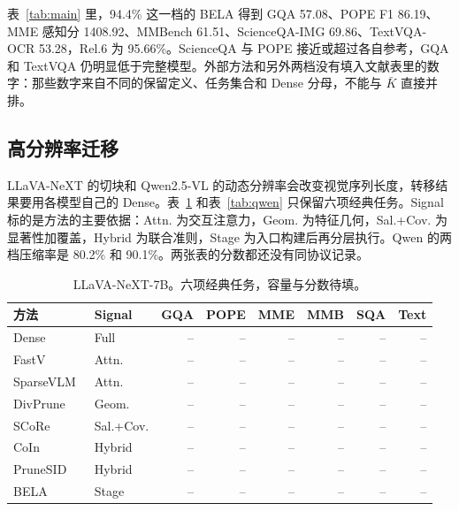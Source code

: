 表~\ref{tab:main} 里，94.4\% 这一档的 BELA 得到 GQA 57.08、POPE F1 86.19、MME 感知分 1408.92、MMBench 61.51、ScienceQA-IMG 69.86、TextVQA-OCR 53.28，Rel.6 为 95.66\%。ScienceQA 与 POPE 接近或超过各自参考，GQA 和 TextVQA 仍明显低于完整模型。外部方法和另外两档没有填入文献表里的数字：那些数字来自不同的保留定义、任务集合和 Dense 分母，不能与 $\bar K$ 直接并排。

\subsection{高分辨率迁移}
\label{sec:transfer}

LLaVA-NeXT 的切块和 Qwen2.5-VL 的动态分辨率会改变视觉序列长度，转移结果要用各模型自己的 Dense。表~\ref{tab:next} 和表~\ref{tab:qwen} 只保留六项经典任务。Signal 标的是方法的主要依据：Attn. 为交互注意力，Geom. 为特征几何，Sal.+Cov. 为显著性加覆盖，Hybrid 为联合准则，Stage 为入口构建后再分层执行。Qwen 的两档压缩率是 80.2\% 和 90.1\%。两张表的分数都还没有同协议记录。

\begin{table}[t]
\centering
\scriptsize
\setlength{\tabcolsep}{2.4pt}
\caption{LLaVA-NeXT-7B。六项经典任务，容量与分数待填。}
\label{tab:next}
\begin{tabular}{@{}llrrrrrr@{}}
\hline
方法 & Signal & GQA & POPE & MME & MMB & SQA & Text \\
\hline
Dense & Full & -- & -- & -- & -- & -- & -- \\
FastV~\cite{fastv} & Attn. & -- & -- & -- & -- & -- & -- \\
SparseVLM~\cite{sparsevlm} & Attn. & -- & -- & -- & -- & -- & -- \\
DivPrune~\cite{divprune} & Geom. & -- & -- & -- & -- & -- & -- \\
SCoRe~\cite{score} & Sal.+Cov. & -- & -- & -- & -- & -- & -- \\
CoIn~\cite{coin} & Hybrid & -- & -- & -- & -- & -- & -- \\
PruneSID~\cite{prunesid} & Hybrid & -- & -- & -- & -- & -- & -- \\
BELA & Stage & -- & -- & -- & -- & -- & -- \\
\hline
\end{tabular}
\end{table}

